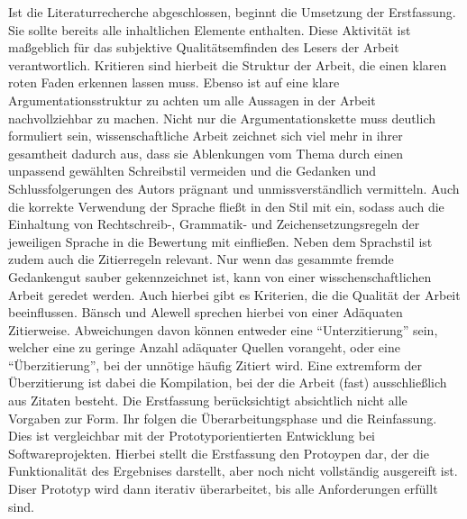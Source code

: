 Ist die Literaturrecherche abgeschlossen, beginnt die Umsetzung der Erstfassung. Sie sollte bereits alle inhaltlichen Elemente enthalten. Diese Aktivität ist maßgeblich für das subjektive Qualitätsemfinden des Lesers der Arbeit verantwortlich. Kritieren sind hierbeit die Struktur der Arbeit, die einen klaren roten Faden erkennen lassen muss. Ebenso ist auf eine klare Argumentationsstruktur zu achten um alle Aussagen in der Arbeit nachvollziehbar zu machen.\cite[Vgl.][S. 59]{Baensch:2013}
Nicht nur die Argumentationskette muss deutlich formuliert sein, wissenschaftliche Arbeit zeichnet sich viel mehr in ihrer gesamtheit dadurch aus, dass sie Ablenkungen vom Thema durch einen unpassend gewählten Schreibstil vermeiden und die Gedanken und Schlussfolgerungen des Autors prägnant und unmissverständlich vermitteln. Auch die korrekte Verwendung der Sprache fließt in den Stil mit ein, sodass auch die Einhaltung von Rechtschreib-, Grammatik- und Zeichensetzungsregeln der jeweiligen Sprache in die Bewertung mit einfließen.\cite[Vgl.][S. 25-27]{Baensch:2013} 
Neben dem Sprachstil ist zudem auch die Zitierregeln relevant. Nur wenn das gesammte fremde Gedankengut sauber gekennzeichnet ist, kann von einer wisschenschaftlichen Arbeit geredet werden. Auch hierbei gibt es Kriterien, die die Qualität der Arbeit beeinflussen. Bänsch und Alewell sprechen hierbei von einer Adäquaten Zitierweise. Abweichungen davon können entweder eine \enquote{Unterzitierung} sein, welcher eine zu geringe Anzahl adäquater Quellen vorangeht, oder eine \enquote{Überzitierung}, bei der unnötige häufig Zitiert wird. Eine extremform der Überzitierung ist dabei die Kompilation, bei der die Arbeit (fast) ausschließlich aus Zitaten besteht.\cite[Vgl.][S.11 f.]{Baensch:2013}
Die Erstfassung berücksichtigt absichtlich nicht alle Vorgaben zur Form. Ihr folgen die Überarbeitungsphase und die Reinfassung. Dies ist vergleichbar mit der Prototyporientierten Entwicklung bei Softwareprojekten. Hierbei stellt die Erstfassung den Protoypen dar, der die Funktionalität des Ergebnises darstellt, aber noch nicht vollständig ausgereift ist. Diser Prototyp wird dann iterativ überarbeitet, bis alle Anforderungen erfüllt sind.\cite[Vgl.][S. 363]{Liggesmeyer:2009}

